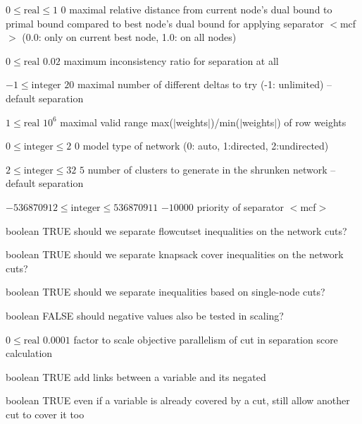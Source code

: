 %
{$0\leq\textrm{real}\leq1$}%
{$0$}%
{maximal relative distance from current node's dual bound to primal bound compared to best node's dual bound for applying separator $<$mcf$>$ (0.0: only on current best node, 1.0: on all nodes)}%
{}

%
{$0\leq\textrm{real}$}%
{$0.02$}%
{maximum inconsistency ratio for separation at all}%
{}

%
{$-1\leq\textrm{integer}$}%
{$20$}%
{maximal number of different deltas to try (-1: unlimited)  -- default separation}%
{}

%
{$1\leq\textrm{real}$}%
{$10^{  6}$}%
{maximal valid range max($|$weights$|$)/min($|$weights$|$) of row weights}%
{}

%
{$0\leq\textrm{integer}\leq2$}%
{$0$}%
{model type of network (0: auto, 1:directed, 2:undirected)}%
{}

%
{$2\leq\textrm{integer}\leq32$}%
{$5$}%
{number of clusters to generate in the shrunken network -- default separation}%
{}

%
{$-536870912\leq\textrm{integer}\leq536870911$}%
{$-10000$}%
{priority of separator $<$mcf$>$}%
{}

%
{boolean}%
{TRUE}%
{should we separate flowcutset inequalities on the network cuts?}%
{}

%
{boolean}%
{TRUE}%
{should we separate knapsack cover inequalities on the network cuts?}%
{}

%
{boolean}%
{TRUE}%
{should we separate inequalities based on single-node cuts?}%
{}

%
{boolean}%
{FALSE}%
{should negative values also be tested in scaling?}%
{}

%
{$0\leq\textrm{real}$}%
{$0.0001$}%
{factor to scale objective parallelism of cut in separation score calculation}%
{}

%
{boolean}%
{TRUE}%
{add links between a variable and its negated}%
{}

%
{boolean}%
{TRUE}%
{even if a variable is already covered by a cut, still allow another cut to cover it too}%
{}

